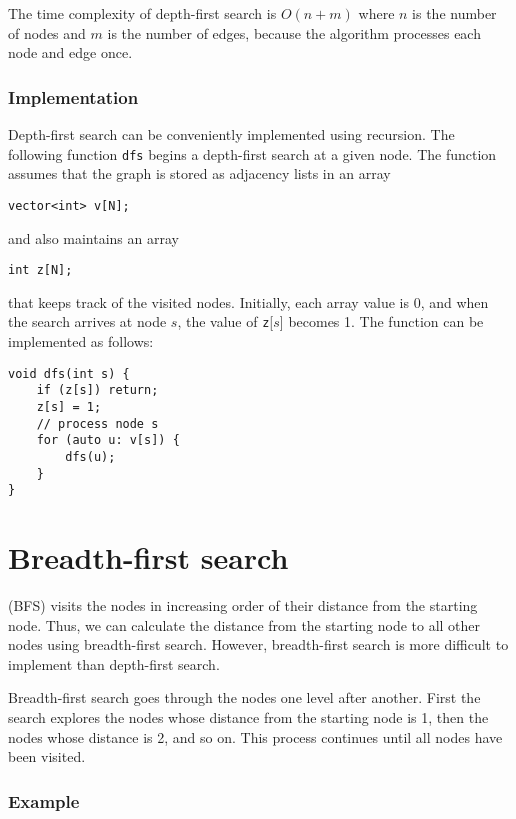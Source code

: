 The time complexity of depth-first search is $O(n+m)$
where $n$ is the number of nodes and $m$ is the
number of edges,
because the algorithm processes each node and edge once.

\subsubsection*{Implementation}

Depth-first search can be conveniently
implemented using recursion.
The following function \texttt{dfs} begins
a depth-first search at a given node.
The function assumes that the graph is
stored as adjacency lists in an array
\begin{lstlisting}
vector<int> v[N];
\end{lstlisting}
and also maintains an array
\begin{lstlisting}
int z[N];
\end{lstlisting}
that keeps track of the visited nodes.
Initially, each array value is 0,
and when the search arrives at node $s$,
the value of \texttt{z}[$s$] becomes 1.
The function can be implemented as follows:
\begin{lstlisting}
void dfs(int s) {
    if (z[s]) return;
    z[s] = 1;
    // process node s
    for (auto u: v[s]) {
        dfs(u);
    }
}
\end{lstlisting}

\section{Breadth-first search}


 (BFS) visits the nodes
in increasing order of their distance
from the starting node.
Thus, we can calculate the distance
from the starting node to all other
nodes using breadth-first search.
However, breadth-first search is more difficult
to implement than depth-first search.

Breadth-first search goes through the nodes
one level after another.
First the search explores the nodes whose
distance from the starting node is 1,
then the nodes whose distance is 2, and so on.
This process continues until all nodes
have been visited.

\subsubsection*{Example}

